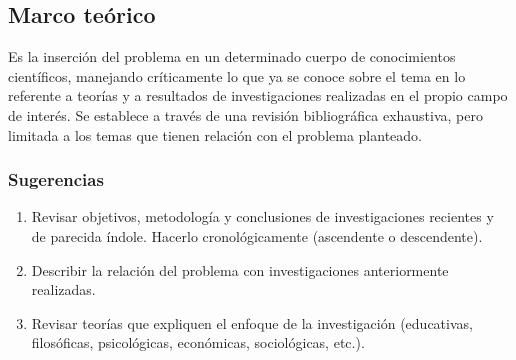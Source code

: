 \subsection{Marco teórico}
Es la inserción del problema en un determinado cuerpo de conocimientos científicos, manejando críticamente lo que ya se conoce sobre el tema en lo referente a teorías y a resultados de investigaciones realizadas en el propio campo de interés. Se establece a través de una revisión bibliográfica exhaustiva, pero limitada a los temas que tienen relación con el problema planteado.


\subsubsection{Sugerencias}

\begin{enumerate}[noitemsep]
 \item Revisar objetivos, metodología y conclusiones de investigaciones recientes y de parecida índole. Hacerlo cronológicamente (ascendente o descendente).
 \item Describir la relación del problema con investigaciones anteriormente realizadas.
 \item Revisar teorías que expliquen el enfoque de la investigación (educativas, filosóficas, psicológicas, económicas, sociológicas, etc.).
\end{enumerate}
